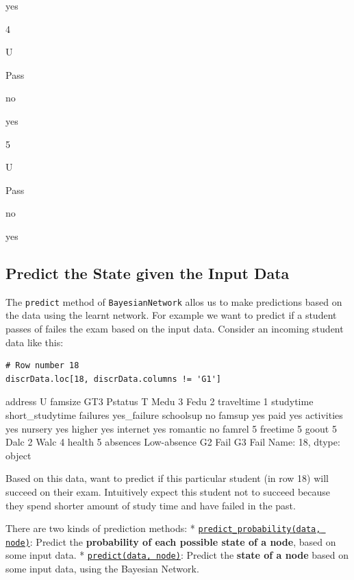 \documentclass[
]{article}
\begin{document}
yes

4

U

Pass

no

yes

5

U

Pass

no

yes

\hypertarget{predict-the-state-given-the-input-data}{%
\subsection{Predict the State given the Input
Data}\label{predict-the-state-given-the-input-data}}

The \texttt{predict} method of
\texttt{BayesianNetwork} allos us to make predictions
based on the data using the learnt network. For example we want to
predict if a student passes of failes the exam based on the input data.
Consider an incoming student data like this:

\begin{verbatim}
# Row number 18
discrData.loc[18, discrData.columns != 'G1']
\end{verbatim}

address U famsize GT3 Pstatus T Medu 3 Fedu 2 traveltime 1 studytime
short\_studytime failures yes\_failure schoolsup no famsup yes paid yes
activities yes nursery yes higher yes internet yes romantic no famrel 5
freetime 5 goout 5 Dalc 2 Walc 4 health 5 absences Low-absence G2 Fail
G3 Fail Name: 18, dtype: object

Based on this data, want to predict if this particular student (in row
18) will succeed on their exam. Intuitively expect this student not to
succeed because they spend shorter amount of study time and have failed
in the past.

There are two kinds of prediction methods: *
\href{https://causalnex.readthedocs.io/en/latest/source/api_docs/causalnex.network.BayesianNetwork.html\#causalnex.network.BayesianNetwork.predict_probability}{\texttt{predict_probability(data, node)}}:
Predict the \textbf{probability of each possible state of a node}, based
on some input data. *
\href{https://causalnex.readthedocs.io/en/latest/source/api_docs/causalnex.network.BayesianNetwork.html\#causalnex.network.BayesianNetwork.predict}{\texttt{predict(data, node)}}:
Predict the \textbf{state of a node } based on some input data, using
the Bayesian Network.
\end{document}
